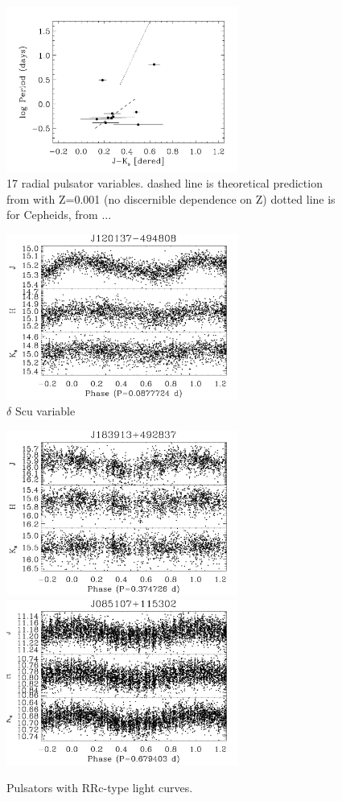 \documentclass[]{emulateapj}
\begin{document}
\begin{figure}[]
\centering
\includegraphics[width=3.0in]{new_plots/color_period_rr}
\caption{17 radial pulsator variables. dashed line is theoretical prediction from \citet{catelan2004} with Z=0.001 (no discernible dependence on Z) dotted line is for Cepheids, from ...}
\label{rr_color_period}
\end{figure}


\begin{figure}[]
\centering
\includegraphics[width=3.0in]{new_plots/rr_0}
\caption{$\delta$ Scu variable}
\label{rrshort}
\end{figure}


\begin{figure}[]
\centering
\includegraphics[width=3.0in]{new_plots/rr_1}
\includegraphics[width=3.0in]{new_plots/rr_8}
\caption{Pulsators with RRc-type light curves.}
\label{rrc}
\end{figure}
\end{document}
